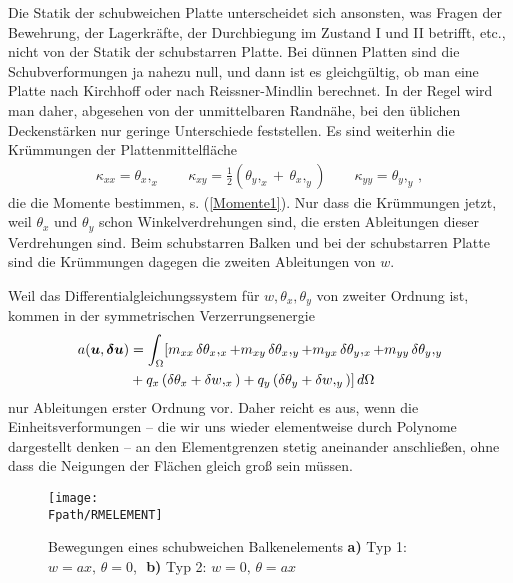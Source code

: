 Die Statik der schubweichen Platte unterscheidet sich ansonsten, was Fragen der Bewehrung, der Lagerkr\"{a}fte, der Durchbiegung im Zustand I und II betrifft, etc., nicht von der Statik der schubstarren Platte. Bei d\"{u}nnen Platten sind die Schubverformungen ja nahezu null, und dann ist es gleichg\"{u}ltig, ob man eine Platte nach Kirchhoff oder nach Reissner-Mindlin berechnet. In der Regel wird man daher, abgesehen von der unmittelbaren Randn\"{a}he, bei den \"{u}blichen Deckenst\"{a}rken nur geringe Unterschiede feststellen. Es sind weiterhin die Kr\"{u}mmungen der Plattenmittelfl\"{a}che
\begin{align}
\kappa_{xx} = \theta_x,_x \qquad \kappa_{xy} = \frac{1}{2}(\theta_y,_x+ \, \theta_x,_y)
\qquad \kappa_{yy} = \theta_y,_y\,,
\end{align}
die die Momente bestimmen, s. (\ref{Momente1}). Nur dass die Kr\"{u}mmungen jetzt, weil $\theta_x$ und $\theta_y$ schon Winkelverdrehungen sind, die ersten Ableitungen dieser Verdrehungen sind. Beim schubstarren Balken und bei der schubstarren Platte sind die Kr\"{u}mmungen dagegen die zweiten Ableitungen von $w$.

Weil das Differentialgleichungssystem f\"{u}r $w, \theta_x, \theta_y$ von zweiter Ordnung ist, kommen in der symmetrischen Verzerrungsenergie
\begin{align}
a(\mbox{\boldmath $u$}, \mbox{\boldmath $\delta$} \mbox{\boldmath $u$}) &= \int_\Omega [m_{xx}\, \delta \theta_x,_x + m_{xy}\,
\delta \theta_x,_y +
m_{yx} \,\delta \theta_y,_x + m_{yy}\,\delta \theta_y,_y\nonumber \\
 & + q_x \,(\delta \theta_x + \delta w,_x) + q_y\, (\delta \theta_y + \delta w,_y)] \,d\Omega \nonumber
\end{align}
nur Ableitungen erster Ordnung vor. Daher reicht es aus, wenn die Einheitsverformungen -- die wir uns wieder elementweise durch Polynome dargestellt denken -- an den Elementgrenzen stetig aneinander anschlie{\ss}en, ohne dass die Neigungen der Fl\"{a}chen gleich gro{\ss} sein m\"{u}ssen.
\begin{figure}[tbp]
\if {} \sidecaption \fi
\texttt{[image: \\Fpath/RMELEMENT]}
\caption{Bewegungen eines schubweichen Balkenelements {\bf a)} Typ 1: $w = ax,\, \theta =
0 $,\,\, {\bf b)} Typ 2: $w = 0,\, \theta = a x$} \label{RMElement}
\end{figure}%

